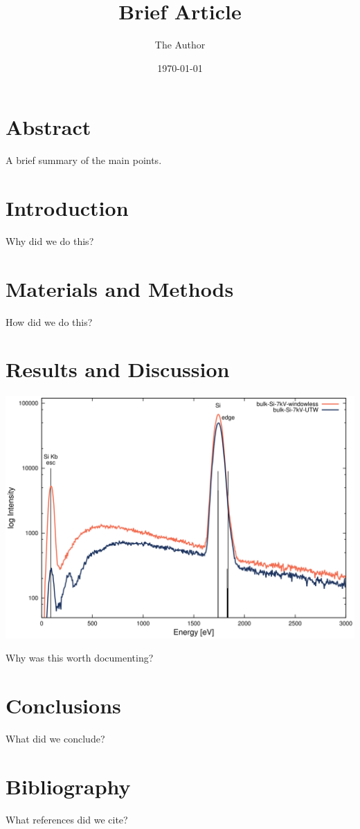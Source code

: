 \documentclass[11pt]{article} %
\title{Brief Article}
\author{The Author}
\date{\today} %
\begin{document}
\maketitle

\section{Abstract}

A brief summary of the main points.

\section{Introduction}

Why did we do this?

\section{Materials and Methods}

How did we do this?

\section{Results and Discussion}

\includegraphics[width=6.5in,scale=0.125]{figures/Si-at-7kV-window.png}


Why was this worth documenting?

\section{Conclusions}

What did we conclude?

\section{Bibliography}

What references did we cite?





\end{document}
